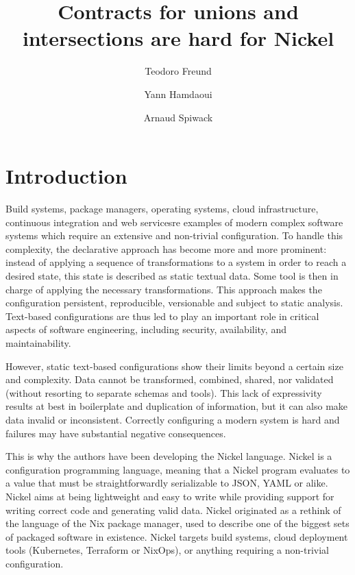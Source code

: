 \documentclass[sigplan,10pt,review,anonymous]{acmart}
\title{Contracts for unions and intersections are hard for Nickel}
\author{Teodoro Freund}
\affiliation{
  \institution{???}
  \city{Buenos Aires}
  \country{Argentina}
}
\author{Yann Hamdaoui}
\affiliation{
  \institution{Tweag}
  \city{Paris}
  \country{France}
}
\author{Arnaud Spiwack}
\affiliation{
  \institution{Tweag}
  \city{Paris}
  \country{France}
}
\newcommand{\unsure}[2][1=]{}
\newcommand{\info}[2][1=]{}
\newcommand{\resolved}[2]{}
\begin{document}
\maketitle

\unsure{TODO: CCS classification; Keywords}
\section{Introduction}
\info{Goals of the paper: position paper: unions/intersections nice in
theory problematic in practice. In particular non-orthogonal with the
rest of the features of your language.}

Build systems, package managers, operating systems, cloud infrastructure,
continuous integration and web services\resolved{Also continuous integration}
are examples of modern complex software systems which require an extensive and
non-trivial configuration. To handle this complexity, the declarative approach
has become more and more prominent: instead of applying a sequence of
transformations to a system in order to reach a desired state, this state is
described as static textual data. Some tool is then in charge of applying the
necessary transformations. This approach makes the configuration persistent,
reproducible, versionable and subject to static analysis. Text-based
configurations are thus led to play an important role in critical aspects of
software engineering, including security, availability, and maintainability.

However, static text-based configurations show their limits beyond a certain
size and complexity. Data cannot be transformed, combined, shared, nor validated
(without resorting to separate schemas and tools).  This lack of expressivity
results at best in boilerplate and duplication of information, but it can also
make data invalid or inconsistent.  Correctly configuring a modern system is hard
and failures may have substantial negative consequences.

This is why the authors have been developing the Nickel
language\cite{NickelRepo}. Nickel is a configuration programming language,
meaning that a Nickel program evaluates to a value that must be
straightforwardly serializable to JSON, YAML or alike. Nickel aims at being
lightweight and easy to write while providing support for writing correct code
and generating valid data. Nickel originated as a rethink of the language of the
Nix package manager, used to describe one of the biggest sets of packaged
software in existence\cite{repology}.  Nickel targets build systems, cloud
deployment tools (Kubernetes, Terraform or NixOps), or anything requiring a
non-trivial configuration.
\end{document}
